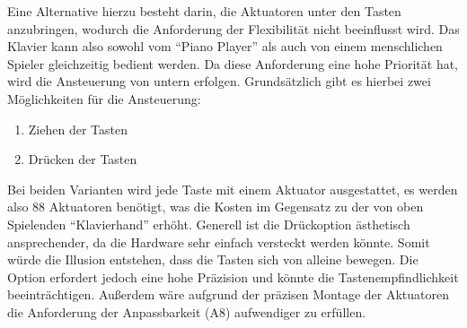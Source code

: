 Eine Alternative hierzu besteht darin, die Aktuatoren unter den Tasten anzubringen, wodurch die Anforderung der Flexibilität nicht beeinflusst wird.\newline
Das Klavier kann also sowohl vom \enquote{Piano Player} als auch von einem menschlichen Spieler gleichzeitig bedient werden.
Da diese Anforderung eine hohe Priorität hat, wird die Ansteuerung von untern erfolgen. \newline
Grundsätzlich gibt es hierbei zwei Möglichkeiten für die Ansteuerung:
\begin{enumerate}
	\item Ziehen der Tasten
	\item Drücken der Tasten
\end{enumerate}
Bei beiden Varianten wird jede Taste mit einem Aktuator
ausgestattet, es werden also 88 Aktuatoren benötigt, was die Kosten
im Gegensatz zu der von oben Spielenden \enquote{Klavierhand}
erhöht.
Generell ist die Drückoption ästhetisch ansprechender, da die Hardware sehr einfach versteckt werden könnte.
Somit würde die Illusion entstehen, dass die Tasten sich von alleine bewegen. Die Option erfordert jedoch eine hohe Präzision und könnte die
Tastenempfindlichkeit beeinträchtigen. Außerdem wäre aufgrund der präzisen Montage der Aktuatoren die Anforderung
der Anpassbarkeit (A8) aufwendiger zu erfüllen.


